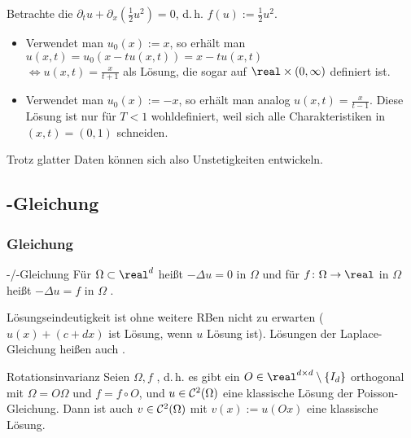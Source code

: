 \linie

\begin{Bsp}
    Betrachte die 
    $\partial_t u + \partial_x (\frac{1}{2} u^2) = 0$, d.\,h. $f(u) := \frac{1}{2} u^2$.
    \begin{itemize}
        \item
        Verwendet man $u_0(x) := x$, so erhält man
        $u(x, t) = u_0(x - t u(x, t)) = x - t u(x, t)$\\
        $\iff u(x, t) = \frac{x}{t + 1}$ als Lösung, die sogar auf $\real \times (0, \infty)$
        definiert ist.
        
        \item
        Verwendet man $u_0(x) := -x$, so erhält man analog $u(x, t) = \frac{x}{t - 1}$.
        Diese Lösung ist nur für $T < 1$ wohldefiniert, weil sich alle Charakteristiken in
        $(x, t) = (0, 1)$ schneiden.
    \end{itemize}
    Trotz glatter Daten können sich also Unstetigkeiten entwickeln.
\end{Bsp}

\pagebreak

\subsection{%
    -Gleichung%
}

\subsubsection{%
    Gleichung%
}

\begin{Def}{-/-Gleichung}
    Für $\Omega \subset \real^d$ heißt $-\Delta u = 0$ in $\Omega$
     und für $f\colon \Omega \to \real$ in $\Omega$ heißt
    $-\Delta u = f$ in $\Omega$ .
\end{Def}

\begin{Bem}
    Lösungseindeutigkeit ist ohne weitere RBen nicht zu erwarten
    ($u(x) + (c + dx)$ ist Lösung, wenn $u$ Lösung ist).
    Lösungen der Laplace-Gleichung heißen auch .
\end{Bem}

\linie

\begin{Satz}{Rotationsinvarianz}
    Seien $\Omega, f$ ,
    d.\,h. es gibt ein $O \in \real^{d \times d} \setminus \{I_d\}$ orthogonal mit
    $\Omega = O\Omega$ und $f = f \circ O$,
    und $u \in \mathcal{C}^2(\Omega)$ eine klassische Lösung der Poisson-Gleichung.
    Dann ist auch $v \in \mathcal{C}^2(\Omega)$ mit $v(x) := u(Ox)$ eine klassische Lösung.
\end{Satz}

